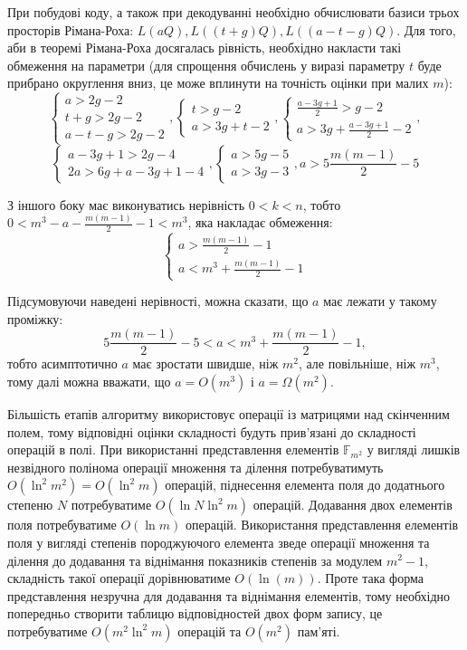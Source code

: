 \documentclass[a4paper,14pt,oneside]{extarticle}
\begin{document}
При побудові коду, а також при декодуванні необхідно обчислювати базиси трьох просторів Рімана-Роха: $L(aQ), L( (t+g)Q ), L( (a-t-g)Q)$. 
Для того, аби в теоремі Рімана-Роха досягалась рівність, необхідно накласти такі обмеження на параметри (для спрощення обчислень у виразі параметру $t$ 
буде прибрано округлення вниз, це може вплинути на точність оцінки при малих $m$):
$$
\begin{cases}
    a > 2g - 2 \\
    t+g > 2g - 2 \\
    a - t -g > 2g -2
\end{cases},
\begin{cases}
    t > g - 2 \\
    a > 3g + t - 2
\end{cases},
\begin{cases}
    \frac{a-3g+1}{2} > g - 2 \\
    a > 3g + \frac{a-3g+1}{2} - 2
\end{cases},
$$
$$
\begin{cases}
    a-3g+1 > 2g - 4 \\
    2a > 6g + a-3g+1 - 4
\end{cases},
\begin{cases}
    a > 5g - 5 \\
    a > 3g - 3
\end{cases},
a > 5 \frac{m(m-1)}{2} - 5
$$

З іншого боку має виконуватись нерівність $0 < k < n$, тобто $0 < m^3 - a - \frac{m(m-1)}{2} - 1 < m^3$, яка накладає обмеження:
$$
\begin{cases}
    a > \frac{m(m-1)}{2} - 1 \\
    a < m^3 + \frac{m(m-1)}{2} - 1
\end{cases}
$$

Підсумовуючи наведені нерівності, можна сказати, що $a$ має лежати у такому проміжку:
$$5 \frac{m(m-1)}{2} - 5 < a < m^3 + \frac{m(m-1)}{2} - 1,$$
тобто асимптотично $a$ має зростати швидше, ніж $m^2$, але повільніше, ніж $m^3$, тому далі можна вважати, що $a=O(m^3)$ і $a=\Omega(m^2)$.

Більшість етапів алгоритму використовує операції із матрицями над скінченним полем, тому відповідні оцінки складності будуть прив'язані 
до складності операцій в полі. При використанні представлення елементів $\mathbb{F}_{m^2}$ у вигляді лишків незвідного полінома операції 
множення та ділення потребуватимуть $O(\ln^2 m^2)=O(\ln^2 m)$ операцій, піднесення елемента поля до додатнього степеню $N$ потребуватиме 
$O(\ln N \ln^2 m)$ операцій. Додавання двох елементів поля потребуватиме $O(\ln m)$ операцій. Використання представлення елементів поля у 
вигляді степенів породжуючого елемента зведе операції множення та ділення до додавання та віднімання показників степенів за модулем $m^2-1$, 
складність такої операції дорівнюватиме $O(\ln(m))$. Проте така форма представлення незручна для додавання та віднімання елементів, тому 
необхідно попередньо створити таблицю відповідностей двох форм запису, це потребуватиме $O(m^2 \ln^2 m)$ операцій та $O(m^2)$ пам'яті.
\end{document}

